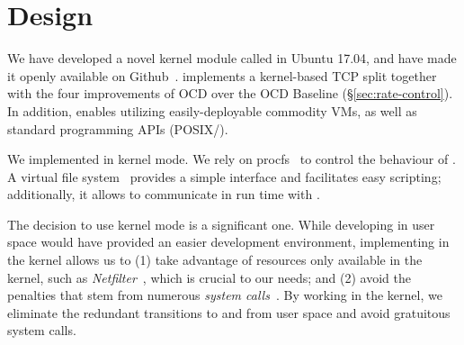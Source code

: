 \section{Design}
\label{sec:design}
 We have developed a novel kernel module called \textit{\oursys} in Ubuntu 17.04, and have made it openly available on Github~\cite{ktcp}. \oursys implements a kernel-based TCP split together with the four improvements of OCD \oursys over the OCD Baseline (\S\ref{sec:rate-control}). 
In addition, \oursys enables utilizing easily-deployable commodity VMs, as well as  standard programming APIs (POSIX/\sockets). %

 We implemented \oursys in kernel mode. We rely on procfs~\cite{proc} to control the behaviour of \oursys. A virtual file system~\cite{virtfs} provides a simple interface and facilitates easy scripting; additionally, it allows to communicate in run time with \oursys.

The decision to use kernel mode is a significant one. While developing in user space would have provided an easier development environment, implementing \oursys in the kernel allows us to (1) take advantage of resources only available in the kernel, such as \textit{Netfilter}~\cite{netfilter}, which is crucial to our needs; and (2) avoid the penalties that stem from numerous \textit{system calls}~\cite{Copy, FlexSC}. By working in the kernel, we eliminate the redundant transitions to and from user space and avoid gratuitous system calls. 



